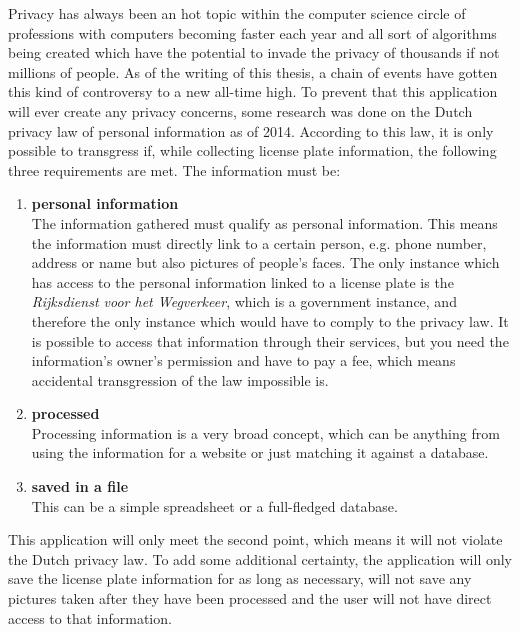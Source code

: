 
Privacy has always been an hot topic within the computer science circle of professions with computers becoming faster each year and all sort of algorithms being created which have the potential to invade the privacy of thousands if not millions of people. As of the writing of this thesis, a chain of events have gotten this kind of controversy to a new all-time high. 
To prevent that this application will ever create any privacy concerns, some research was done on the Dutch privacy law of personal information as of 2014. According to this law, it is only possible to transgress if, while collecting license plate information, the following three requirements are met. The information must be:

\begin{enumerate}
    \item{\textbf{personal information} \\
        The information gathered must qualify as personal information. This means the information must directly link to a certain person, e.g. phone number, address or name but also pictures of people's faces. The only instance which has access to the personal information linked to a license plate is the \textit{Rijksdienst voor het Wegverkeer}, which is a government instance, and therefore the only instance which would have to comply to the privacy law. It is possible to access that information through their services, but you need the information's owner's permission and have to pay a fee, which means accidental transgression of the law impossible is.
    }

    \item{\textbf{processed} \\
        Processing information is a very broad concept, which can be anything from using the information for a website or just matching it against a database.
    }

    \item{\textbf{saved in a file} \\
        This can be a simple spreadsheet or a full-fledged database.
    }
\end{enumerate}

This application will only meet the second point, which means it will not violate the Dutch privacy law. To add some additional certainty, the application will only save the license plate information for as long as necessary, will not save any pictures taken after they have been processed and the user will not have direct access to that information.

